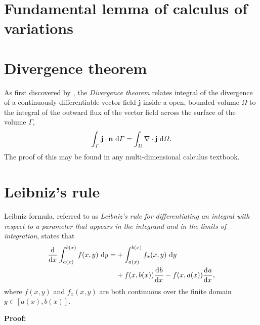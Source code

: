 \section{Fundamental lemma of calculus of variations}

\section{Divergence theorem} \label{ssn_divergence_theorem}

As first discovered by \citet{lagrange_1762}, the \emph{Divergence theorem} relates integral of the divergence of a continuously-differentiable vector field $\mathbf{j}$ inside a open, bounded volume $\Omega$ to the integral of the outward flux of the vector field across the surface of the volume $\Gamma$,
\begin{align}
  \label{divergence_theorem}
  \int_{\varGamma} \mathbf{j} \cdot \mathbf{n} \ \mathrm{d}\varGamma = \int_{\varOmega} \nabla \cdot \mathbf{j} \ \mathrm{d}\varOmega.
\end{align}
The proof of this may be found in any multi-dimensional calculus textbook.

\section{Leibniz's rule} \label{ssn_liebniz_rule}

Leibniz formula, referred to as \emph{Leibniz's rule for differentiating an integral with respect to a parameter that appears in the integrand and in the limits of integration}, states that
\begin{align}
  \label{leibniz_rule}
  \frac{\mathrm{d}^{} }{\mathrm{d} x^{} } \int_{a(x)}^{b(x)} f(x,y) \ \mathrm{d}y = &+ \int_{a(x)}^{b(x)} f_x(x,y) \ \mathrm{d}y \notag \\
  &+ f(x,b(x)) \frac{\mathrm{d}^{} b}{\mathrm{d} x^{} } - f(x,a(x))\frac{\mathrm{d}^{} a}{\mathrm{d} x^{} },
\end{align}
where $f(x,y)$ and $f_x(x,y)$ are both continuous over the finite domain $y \in [a(x),b(x)]$.

\vspace{2mm}
\noindent \textbf{Proof:}

